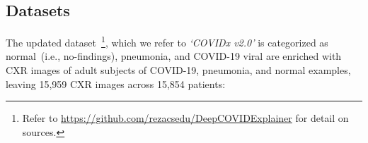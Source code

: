\documentclass[conference]{IEEEtran}
\begin{document}
\subsection{Datasets}
\label{sec:ds}

The updated dataset~\footnote{Refer to \url{https://github.com/rezacsedu/DeepCOVIDExplainer} for detail on sources.}, which we refer to \emph{`COVIDx v2.0'} is categorized as normal~(i.e., no-findings), pneumonia, and COVID-19 viral are enriched with CXR images of adult subjects of COVID-19, pneumonia, and normal examples, leaving 15,959 CXR images across 15,854 patients: 

\end{document}
